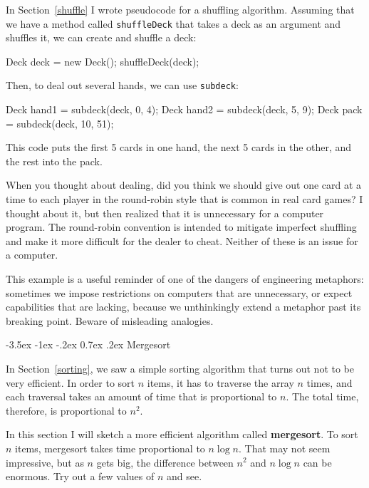 \documentclass{book}
\makeatletter
\renewcommand{\section}{\@startsection 
    {section} {1} {0mm}%
    {-3.5ex \@plus -1ex \@minus -.2ex}%
    {0.7ex \@plus.2ex}%
    {\normalfont\Large\bfseries}}
\makeatother
\begin{document}
In Section~\ref{shuffle} I wrote pseudocode for a shuffling algorithm.
Assuming that we have a method called {\tt shuffleDeck} that takes
a deck as an argument and shuffles it, we can create and shuffle
a deck:

\begin{verbatimtab}
    Deck deck = new Deck();
    shuffleDeck(deck);
\end{verbatimtab}
%
Then, to deal out several hands, we can use {\tt subdeck}:

\begin{verbatimtab}
   Deck hand1 = subdeck(deck, 0, 4);
   Deck hand2 = subdeck(deck, 5, 9);
   Deck pack = subdeck(deck, 10, 51);
\end{verbatimtab}
%
This code puts the first 5 cards in one hand, the next 5 cards
in the other, and the rest into the pack.

When you thought about dealing, did you think we should give out one
card at a time to each player in the round-robin style that is common
in real card games?  I thought about it, but then realized that it is
unnecessary for a computer program.  The round-robin convention is
intended to mitigate imperfect shuffling and make it more difficult
for the dealer to cheat.  Neither of these is an issue for a computer.

This example is a useful reminder of one of the dangers of engineering
metaphors: sometimes we impose restrictions on computers that are
unnecessary, or expect capabilities that are lacking, because we
unthinkingly extend a metaphor past its breaking point.  Beware of
misleading analogies.


\section {Mergesort}
\label{mergesort}

In Section~\ref{sorting}, we saw a simple sorting algorithm that turns
out not to be very efficient.  In order to sort $n$ items, it has to
traverse the array $n$ times, and each traversal takes an amount of
time that is proportional to $n$.  The total time, therefore, is
proportional to $n^2$.

In this section I will sketch a more efficient algorithm called {\bf
mergesort}.  To sort $n$ items, mergesort takes time proportional to
$n \log n$.  That may not seem impressive, but as $n$ gets big, the
difference between $n^2$ and $n \log n$ can be enormous.  Try out a
few values of $n$ and see.
\end{document}
